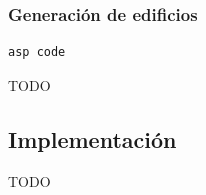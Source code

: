 \subsubsection{Generación de edificios}

\begin{lstlisting}[label=lst:def]
	asp code
\end{lstlisting}

TODO

\subsection{Implementación}
\label{subsec:implementacion}

TODO